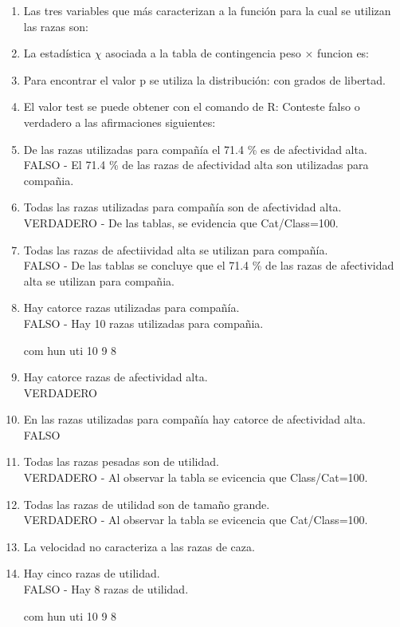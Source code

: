 \documentclass[letterpaper, 12pt]{article}
\begin{document}
\newpage 
\begin{enumerate}

\item Las tres variables que más caracterizan a la función para la cual se
utilizan las razas son: 

\item La estadística $\chi$ asociada a la tabla de contingencia peso × funcion
es:
\item Para encontrar el valor p se utiliza la distribución: con grados de libertad.
\item El valor test se puede obtener con el comando de R:
Conteste falso o verdadero a las afirmaciones siguientes:
\item De las razas utilizadas para compañía el 71.4 \% es de afectividad
alta.\\
FALSO - El 71.4 \% de las razas de afectividad alta son utilizadas para 
compañia.
\item Todas las razas utilizadas para compañía son de afectividad alta.\\
VERDADERO - De las tablas, se evidencia que Cat/Class=100.
\item Todas las razas de afectiividad alta se utilizan para compañía.\\
FALSO - De las tablas se concluye que el 71.4 \% de las razas de afectividad alta
se utilizan para compañia.
\item Hay catorce razas utilizadas para compañía.\\
FALSO - Hay 10 razas utilizadas para compañia.
\begin{Schunk}
\begin{Soutput}
com hun uti 
 10   9   8 
\end{Soutput}
\end{Schunk}
\item Hay catorce razas de afectividad alta.\\
VERDADERO
\item En las razas utilizadas para compañía hay catorce de afectividad alta.\\
FALSO
\item Todas las razas pesadas son de utilidad.\\
VERDADERO - Al observar la tabla se evicencia que Class/Cat=100.
\item Todas las razas de utilidad son de tamaño grande.\\
VERDADERO - Al observar la tabla se evicencia que Cat/Class=100.
\item La velocidad no caracteriza a las razas de caza.
\item Hay cinco razas de utilidad.\\
FALSO - Hay 8 razas de utilidad.
\begin{Schunk}
\begin{Soutput}
com hun uti 
 10   9   8 
\end{Soutput}
\end{Schunk}
\end{enumerate}
\end{document}
